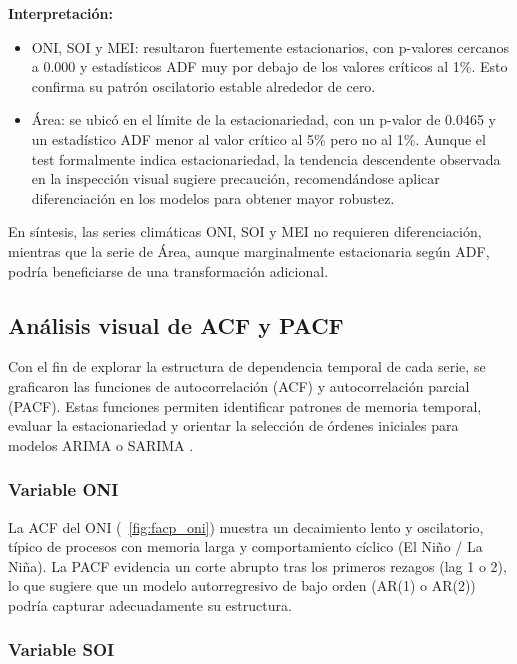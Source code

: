 \textbf{Interpretación:}  
\begin{itemize}
    \item ONI, SOI y MEI: resultaron fuertemente estacionarios, con p-valores 
    cercanos a 0.000 y estadísticos ADF muy por debajo de los valores críticos al 1\%. 
    Esto confirma su patrón oscilatorio estable alrededor de cero.
    \item Área: se ubicó en el límite de la estacionariedad, con un p-valor de 
    0.0465 y un estadístico ADF menor al valor crítico al 5\% pero no al 1\%. Aunque el 
    test formalmente indica estacionariedad, la tendencia descendente observada en la 
    inspección visual sugiere precaución, recomendándose aplicar diferenciación en los 
    modelos para obtener mayor robustez.
\end{itemize}


En síntesis, las series climáticas ONI, SOI y MEI no requieren diferenciación, mientras que 
la serie de Área, aunque marginalmente estacionaria según ADF, podría beneficiarse de 
una transformación adicional.

\subsection{Análisis visual de ACF y PACF}

Con el fin de explorar la estructura de dependencia temporal de cada serie, se graficaron 
las funciones de autocorrelación (ACF) y autocorrelación parcial (PACF). Estas funciones 
permiten identificar patrones de memoria temporal, evaluar la estacionariedad y orientar 
la selección de órdenes iniciales para modelos ARIMA o SARIMA \parencite{box2015time, hyndman2018forecasting}. 

\subsubsection{Variable ONI}

La ACF del ONI (~\ref{fig:facp_oni}) muestra un decaimiento lento y oscilatorio, típico de procesos con memoria 
larga y comportamiento cíclico (El Niño / La Niña). La PACF evidencia un corte abrupto 
tras los primeros rezagos (lag 1 o 2), lo que sugiere que un modelo autorregresivo de bajo 
orden (AR(1) o AR(2)) podría capturar adecuadamente su estructura.

\subsubsection{Variable SOI}


